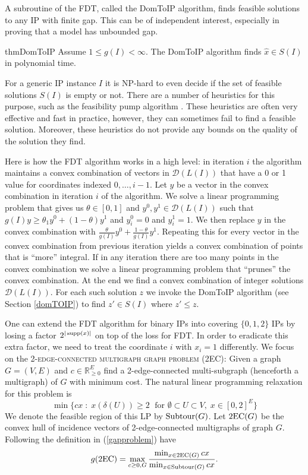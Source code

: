 A subroutine of the FDT, called the DomToIP algorithm, finds feasible solutions to any IP with finite gap. This can be of independent interest, especially in proving that a model has unbounded gap.
\begin{restatable}{thm}{DomToIP}
	\label{domtoIP}
	Assume $1\leq g(I) < \infty$. The DomToIP algorithm finds $\hat{x}\in S(I)$ in polynomial time.
\end{restatable}

For a generic IP instance $I$ it is NP-hard to even decide if the set of feasible solutions $S(I)$ is empty or not. There are a number of heuristics for this purpose, such as the feasibility pump algorithm \cite{fp1,fp2}. These heuristics are often very effective and fast in practice, however, they can sometimes fail to find a feasible solution. Moreover, these heuristics do not provide any bounds on the quality of the solution they find. 

Here is how the FDT algorithm works in a high level: in iteration $i$ the algorithm maintains a convex combination of  vectors in $\mathcal{D}(L(I))$ that have a 0 or 1 value for coordinates indexed $0,\ldots,i-1$. Let $y$ be a vector in the convex combination in iteration $i$ of the algorithm. We solve a linear programming problem that gives us $\theta\in [0,1]$ and $y^0,y^1\in \mathcal{D}(L(I))$ such that $g(I) y\geq \theta_1y^0 + (1-\theta) y^1$ and $y^0_i=0$ and $y^1_i=1$. We then replace $y$ in the convex combination with $\frac{\theta}{g(I)}y^0 +\frac{1-\theta}{g(I)}y^1$. Repeating this for every vector in the convex combination from previous iteration yields a convex combination  of points that is ``more'' integral. If in any iteration there are too many points in the convex combination we solve a linear programming problem that ``prunes'' the convex combination. At the end we find a convex combination of integer solutions $\mathcal{D}(L(I))$. For each such solution $z$ we invoke the DomToIP algorithm (see Section \ref{domTOIP}) to find $z'\in S(I)$ where $z'\leq z$.


One can extend the FDT algorithm for binary IPs into covering $\{0,1,2\}$ IPs by losing a factor $2^{|\operatorname{supp}(x)|}$ on top of the loss for FDT. In order to eradicate this extra factor, we need to treat the coordinate $i$ with $x_i=1$ differently. We focus on the \textsc{2-edge-connected multigraph graph problem (2EC)}: Given a graph $G=(V,E)$ and $c\in \mathbb{R}^{E}_{\geq 0}$ find a 2-edge-connected multi-subgraph (henceforth a multigraph) of $G$ with minimum cost. The natural linear programming relaxation for this problem is 
\begin{equation}
\min \{cx \; : \; x(\delta(U))\geq 2 \; \text{ for }\emptyset \subset U \subset V, \; x\in [0,2]^E\}
\end{equation}
We denote the feasible region of this LP by $\operatorname{{Subtour}}(G)$. Let $\2ec(G)$ be the convex hull of incidence vectors of 2-edge-connected multigraphs of graph $G$. Following the definition in (\ref{gapproblem}) have
\begin{equation}
g(\2ec) = \max_{c\geq 0 , G}\frac{\min_{x\in \2ec(G)} cx}{\min_{x\in \subtour(G)} cx}.
\end{equation}

